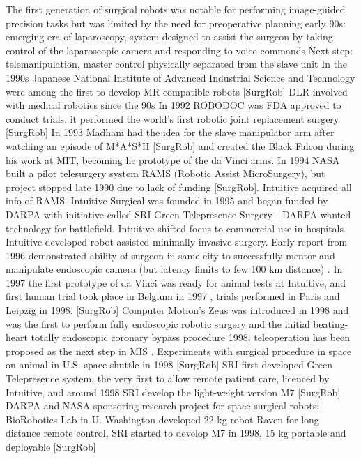The first generation of surgical robots was notable for performing image-guided precision tasks but was limited by the need for preoperative planning
early 90s: emerging era of laparoscopy, system designed to assist the surgeon by taking control of the laparoscopic camera and responding to voice commands
Next step: telemanipulation, master control physically separated from the slave unit
In the 1990s Japanese National Institute of Advanced Industrial Science and Technology were among the first to develop MR compatible robots [SurgRob]
DLR involved with medical robotics since the 90s
In 1992 ROBODOC was FDA approved to conduct trials, it performed the world's first robotic joint replacement surgery [SurgRob]
In 1993 Madhani had the idea for the slave manipulator arm after watching an episode of M*A*S*H [SurgRob] and created the Black Falcon during his work at MIT, becoming he prototype of the da Vinci arms.
In 1994 NASA built a pilot telesurgery system RAMS (Robotic Assist MicroSurgery), but project stopped late 1990 due to lack of funding [SurgRob]. Intuitive acquired all info of RAMS.
Intuitive Surgical was founded in 1995 \citep{bib:intuitive_monopoly} and began funded by DARPA with initiative called SRI Green Telepresence Surgery - DARPA wanted technology for battlefield. Intuitive shifted focus to commercial use in hospitals. Intuitive developed robot-assisted minimally invasive surgery.
Early report from 1996 demonstrated ability of surgeon in same city to successfully mentor and manipulate endoscopic camera (but latency limits to few 100 km distance) \citep{bib:telesurg_history}.
In 1997 the first prototype of da Vinci was ready for animal tests at Intuitive, and first human trial took place in Belgium in 1997 \citep{bib:intuitive_monopoly}, trials performed in Paris and Leipzig in 1998. [SurgRob] 
Computer Motion's Zeus was introduced in 1998 and was the first to perform fully endoscopic robotic surgery and the initial beating-heart totally endoscopic coronary bypass procedure \citep{bib:brown_univ}
1998: teleoperation has been proposed as the next step in MIS \citep{bib:black_falcon}.
Experiments with surgical procedure in space on animal in U.S. space shuttle in 1998 [SurgRob]
SRI first developed Green Telepresence system, the very first to allow remote patient care, licenced by Intuitive, and around 1998 SRI develop the light-weight version M7 [SurgRob]
DARPA and NASA sponsoring research project for space surgical robots: BioRobotics Lab in U. Washington developed 22 kg robot Raven for long distance remote control, SRI started to develop M7 in 1998, 15 kg portable and deployable [SurgRob]
